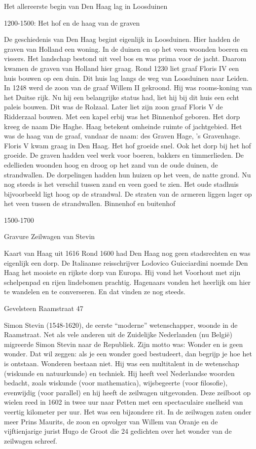 \documentclass[
  a4paper,
]{book}
\theoremstyle{definition}
\theoremstyle{definition}
\theoremstyle{definition}
\theoremstyle{definition}
\theoremstyle{remark}
\begin{document}
Het allereerste begin van Den Haag lag in Loosduinen

1200-1500: Het hof en de haag van de graven

De geschiedenis van Den Haag begint eigenlijk in Loosduinen.
Hier hadden de graven van Holland een woning.
In de duinen en op het veen woonden boeren en vissers.
Het landschap bestond uit veel bos en was prima voor de jacht.
Daarom kwamen de graven van Holland hier graag.
Rond 1230 liet graaf Floris IV een huis bouwen op een duin.
Dit huis lag langs de weg van Loosduinen naar Leiden.
In 1248 werd de zoon van de graaf Willem II gekroond.
Hij was rooms-koning van het Duitse rijk.
Nu hij een belangrijke status had, liet hij bij dit huis een echt paleis bouwen.
Dit was de Rolzaal.
Later liet zijn zoon graaf Floris V de Ridderzaal bouwen.
Met een kapel erbij was het Binnenhof geboren.
Het dorp kreeg de naam Die Haghe.
Haag betekent omheinde ruimte of jachtgebied.
Het was de haag van de graaf, vandaar de naam: des Graven Hage, 's Gravenhage.
Floris V kwam graag in Den Haag. Het hof groeide snel.
Ook het dorp bij het hof groeide.
De graven hadden veel werk voor boeren, bakkers en timmerlieden.
De edellieden woonden hoog en droog op het zand van de oude duinen, de strandwallen.
De dorpelingen hadden hun huizen op het veen, de natte grond.
Nu nog steeds is het verschil tussen zand en veen goed te zien.
Het oude stadhuis bijvoorbeeld ligt hoog op de strandwal.
De straten van de armeren liggen lager op het veen tussen de strandwallen.
Binnenhof en buitenhof

1500-1700

Gravure Zeilwagen van Stevin

Kaart van Haag uit 1616
Rond 1600 had Den Haag nog geen stadsrechten en was eigenlijk een dorp. De Italiaanse reisschrijver Lodovico Guicciardini noemde Den Haag het mooiste en rijkste dorp van Europa. Hij vond het Voorhout met zijn schelpenpad en rijen lindebomen prachtig. Hagenaars vonden het heerlijk om hier te wandelen en te converseren. En dat vinden ze nog steeds.

Gevelsteen Raamstraat 47

Simon Stevin (1548-1620), de eerste ``moderne'' wetenschapper, woonde in de Raamstraat. Net als vele anderen uit de Zuidelijke Nederlanden (nu België) migreerde Simon Stevin naar de Republiek. Zijn motto was: Wonder en is geen wonder. Dat wil zeggen: als je een wonder goed bestudeert, dan begrijp je hoe het is ontstaan. Wonderen bestaan niet. Hij was een multitalent in de wetenschap (wiskunde en natuurkunde) en techniek. Hij heeft veel Nederlandse woorden bedacht, zoals wiskunde (voor mathematica), wijsbegeerte (voor filosofie), evenwijdig (voor parallel) en hij heeft de zeilwagen uitgevonden. Deze zeilboot op wielen reed in 1602 in twee uur naar Petten met een spectaculaire snelheid van veertig kilometer per uur. Het was een bijzondere rit. In de zeilwagen zaten onder meer Prins Maurits, de zoon en opvolger van Willem van Oranje en de vijftienjarige jurist Hugo de Groot die 24 gedichten over het wonder van de zeilwagen schreef.
\end{document}
